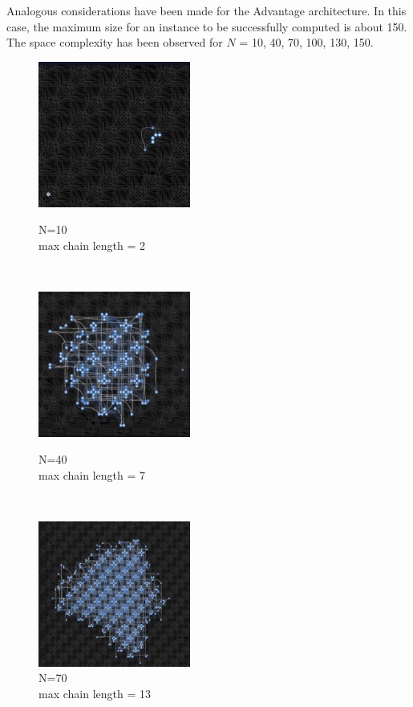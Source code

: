 \documentclass[oneside,a4paper]{article}
\begin{document}
Analogous considerations have been made for the Advantage architecture. In this case, the maximum size for an instance to be successfully computed is about 150. The space complexity has been observed for $N$ = 10, 40, 70, 100, 130, 150.

\begin{figure}[htp]
\begin{minipage}[b]{4.5cm}

\includegraphics[width=5cm]{LaTeXTemplate/Images/Advantagefirst10.png}
\caption{N=10\\max chain length = 2}
\end{minipage}
\ \hspace{2mm} \hspace{2mm} \
\begin{minipage}[b]{4.5cm}

\includegraphics[width=5cm]{LaTeXTemplate/Images/Advantagefirst40.png}
\caption{N=40\\max chain length = 7}
\end{minipage}
\ \hspace{2mm} \hspace{2mm} \
\begin{minipage}[b]{4.5cm}
\centering
\includegraphics[width=5cm]{LaTeXTemplate/Images/Advantagefirst70.png}
\caption{N=70\\max chain length = 13}
\end{minipage}
\end{figure}
\end{document}
